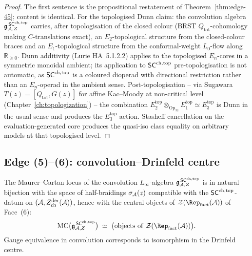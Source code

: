 \begin{proof}
The first sentence is the propositional restatement of
Theorem~\ref{thm:edge-45}; content is identical. For the topologised
Dunn claim: the convolution algebra $\mathfrak{g}^{\,\mathsf{SC}^{\mathrm{ch},\mathrm{top}}}_{\mathcal{A},Z}$
carries, after topologisation of the closed colour (BRST
$Q_{\mathrm{tot}}$-cohomology making $C$-translations exact), an
$E_2$-topological structure from the closed-colour braces and an
$E_1$-topological structure from the conformal-weight $L_0$-flow
along $\mathbb{R}_{\geq 0}$. Dunn additivity (Lurie HA~5.1.2.2) applies
to the topologised $E_n$-cores in a symmetric monoidal ambient; its
application to $\mathsf{SC}^{\mathrm{ch},\mathrm{top}}$ pre-topologisation is not automatic, as
$\mathsf{SC}^{\mathrm{ch},\mathrm{top}}$ is a coloured dioperad with directional restriction rather
than an $E_n$-operad in the ambient sense. Post-topologisation -- via
Sugawara $T(z)=[Q_{\mathrm{tot}},G(z)]$ for affine Kac--Moody at
non-critical level (Chapter~\ref{ch:topologization}) -- the
combination
$E_2^{\mathrm{top}}\otimes_{\mathrm{Op}_\infty}E_1^{\mathrm{top}}
\simeq E_3^{\mathrm{top}}$ is Dunn in the usual sense and produces the
$E_3^{\mathrm{top}}$-action. Stasheff cancellation on the
evaluation-generated core produces the quasi-iso class equality on
arbitrary models at that topologised level.
\end{proof}

\subsection{Edge (5)--(6): convolution--Drinfeld centre}\label{subsec:edge-56}

\begin{theorem}\label{thm:edge-56}%
The Maurer--Cartan locus of the convolution $L_\infty$-algebra
$\mathfrak{g}^{\,\mathsf{SC}^{\mathrm{ch},\mathrm{top}}}_{\mathcal{A},Z}$ is in natural bijection with the space of
half-braidings $\sigma_{\mathcal{A}}(z)$ compatible with the
$\mathsf{SC}^{\mathrm{ch},\mathrm{top}}$-datum on $(\mathcal{A},Z^{\mathrm{der}}_{\mathrm{ch}}(\mathcal{A}))$, hence
with the central objects of
$\cZ(\Rep_{\mathrm{fact}}(\cA))$ of Face~(6):
\begin{equation}
 \MC\bigl(\fg^{\,\SCchtop}_{\cA,Z}\bigr)
 \;\simeq\;
 \bigl(\mathrm{objects\ of\ }
 \cZ(\Rep_{\mathrm{fact}}(\cA))\bigr).
\end{equation}
Gauge equivalence in convolution corresponds to isomorphism in
the Drinfeld centre.
\end{theorem}

